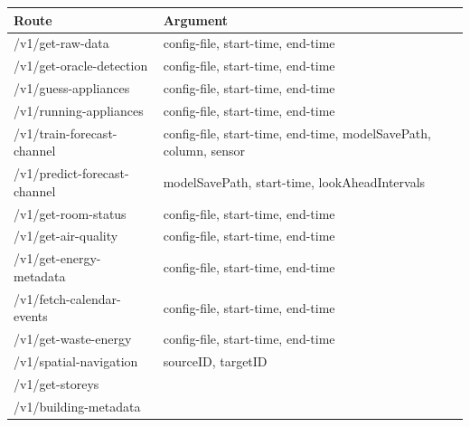 \begin{table}[]
\begin{tabular}{@{}|l|l|@{}}
\toprule
Route                                & Argument     \\ \midrule
/v1/get-raw-data                   & config-file, start-time, end-time  \\ \midrule
/v1/get-oracle-detection           & config-file, start-time, end-time                                              \\ \midrule
/v1/guess-appliances                & config-file, start-time, end-time                                              \\ \midrule
/v1/running-appliances              & config-file, start-time, end-time                                              \\ \midrule
/v1/train-forecast-channel         & config-file, start-time, end-time, modelSavePath, column, sensor               \\ \midrule
/v1/predict-forecast-channel       & modelSavePath, start-time, lookAheadIntervals                                    \\ \midrule
/v1/get-room-status                & config-file, start-time, end-time                                              \\ \midrule
/v1/get-air-quality                & config-file, start-time, end-time                                              \\ \midrule
/v1/get-energy-metadata            & config-file, start-time, end-time                                              \\ \midrule
/v1/fetch-calendar-events          & config-file, start-time, end-time                                              \\ \midrule
/v1/get-waste-energy               & config-file, start-time, end-time                                              \\ \midrule
/v1/spatial-navigation              & sourceID, targetID                                                                \\ \midrule
/v1/get-storeys                     &                                                                                   \\ \midrule
/v1/building-metadata               &                                                                                   \\ \midrule

\end{tabular}
\end{table}
